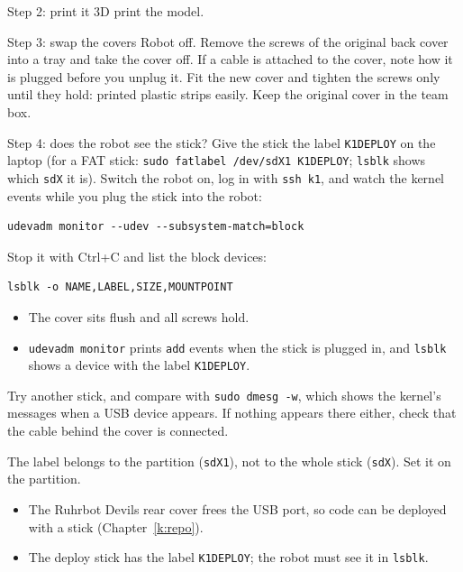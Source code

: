 \begin{stepbox}{Step 2: print it}
3D print the model.
\end{stepbox}

\begin{stepbox}{Step 3: swap the covers}
Robot off. Remove the screws of the original back cover into a tray and take the cover off. If a cable is attached to the cover, note how it is plugged before you unplug it. Fit the new cover and tighten the screws only until they hold: printed plastic strips easily. Keep the original cover in the team box.
\end{stepbox}

\begin{stepbox}{Step 4: does the robot see the stick?}
Give the stick the label \texttt{K1DEPLOY} on the laptop (for a FAT stick: \verb!sudo fatlabel /dev/sdX1 K1DEPLOY!; \verb!lsblk! shows which \texttt{sdX} it is). Switch the robot on, log in with \verb!ssh k1!, and watch the kernel events while you plug the stick into the robot:
\begin{verbatim}
udevadm monitor --udev --subsystem-match=block
\end{verbatim}
Stop it with Ctrl+C and list the block devices:
\begin{verbatim}
lsblk -o NAME,LABEL,SIZE,MOUNTPOINT
\end{verbatim}
\end{stepbox}

\begin{checkbox}
\begin{itemize}[nosep]
  \item The cover sits flush and all screws hold.
  \item \texttt{udevadm monitor} prints \texttt{add} events when the stick is plugged in, and \texttt{lsblk} shows a device with the label \texttt{K1DEPLOY}.
\end{itemize}
\end{checkbox}

\begin{troublebox}
\begin{description}[leftmargin=0.6cm,nosep]
  \item[No events] Try another stick, and compare with \verb!sudo dmesg -w!, which shows the kernel's messages when a USB device appears. If nothing appears there either, check that the cable behind the cover is connected.
  \item[The label is missing] The label belongs to the partition (\texttt{sdX1}), not to the whole stick (\texttt{sdX}). Set it on the partition.
\end{description}
\end{troublebox}

\begin{keyidea}
\begin{itemize}[nosep]
  \item The Ruhrbot Devils rear cover frees the USB port, so code can be deployed with a stick (Chapter~\ref{k:repo}).
  \item The deploy stick has the label \texttt{K1DEPLOY}; the robot must see it in \texttt{lsblk}.
\end{itemize}
\end{keyidea}
